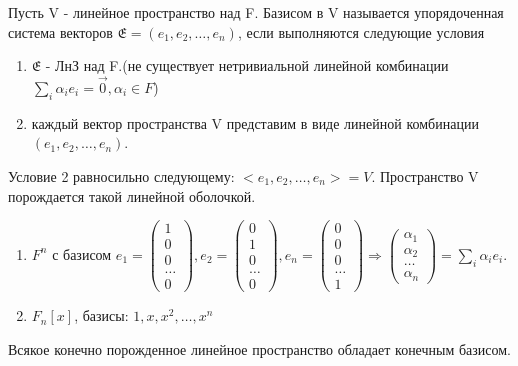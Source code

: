 \begin{definition}
	Пусть V - линейное пространство над F. Базисом в V называется упорядоченная система векторов \(\mathfrak{E}= (e_1, e_2,\ldots, e_n)\), если выполняются следующие условия 
	\begin{enumerate}
		\item \(\mathfrak{E}\) - ЛнЗ над F.(не существует нетривиальной линейной комбинации \(\sum_i\alpha_ie_i=\vec 0, \alpha_i\in F\))
		\item каждый вектор пространства V представим в виде линейной комбинации \((e_1, e_2, \ldots, e_n)\).
	\end{enumerate}
\end{definition}
\begin{note}
	Условие 2 равносильно следующему: \(<e_1, e_2, \ldots, e_n> = V\). Пространство V порождается такой линейной оболочкой.
\end{note}
\begin{example}
	\begin{enumerate}
			\item \(F^n\) с базисом \(e_1 =\begin{pmatrix}
				1 \\ 0 \\ 0 \\ \ldots \\ 0
			\end{pmatrix}, e_2 = \begin{pmatrix}
			 0 \\ 1\\ 0 \\ \ldots \\ 0
			\end{pmatrix}, e_n = \begin{pmatrix}
			0 \\ 0 \\ 0 \\ \ldots \\ 1
			\end{pmatrix}\Longrightarrow \begin{pmatrix}
			\alpha_1 \\ \alpha_2\\\ldots\\\alpha_n
			\end{pmatrix} = \sum_i\alpha_ie_i\).
			\item \(F_n[x]\), базисы: \(1, x, x^2, \ldots, x^n\)
	\end{enumerate}
\end{example}
\begin{proposition}
	Всякое конечно порожденное линейное пространство обладает конечным базисом.
\end{proposition}
